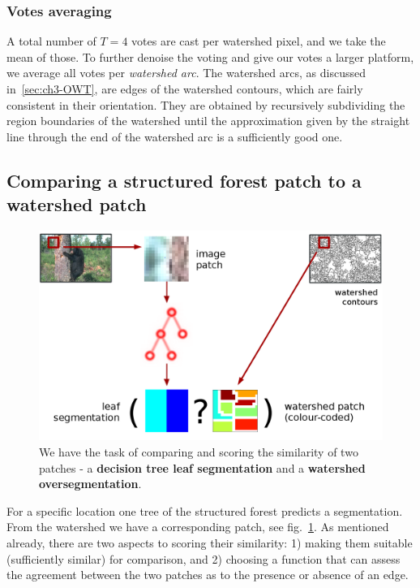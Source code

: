\subsubsection*{Votes averaging}
A total number of $T=4$ votes are cast per watershed pixel, and we take the mean of those. To further denoise the voting and give our votes a larger platform, %
we average all votes per \textit{watershed arc}. The watershed arcs, as discussed in~\ref{sec:ch3-OWT}, are edges of the watershed contours, which are fairly consistent in their orientation. They are obtained by recursively subdividing the region boundaries of the watershed until the approximation given by the straight line through the end of the watershed arc is a sufficiently good one. %

\subsection{Comparing a structured forest patch to a watershed patch}
\begin{figure}[ht!]
\centering
 \includegraphics[width=1\textwidth]{images/SE-SV-UCM/weighting-the-watershed-contours-two-patches.png}
\caption[Structured voting essence: a comparison of two patches]{We have the task of comparing and scoring the similarity of two patches - a \textbf{decision tree leaf segmentation} and a \textbf{watershed oversegmentation}.}
\label{fig:weighting-the-watershed-contours}
\end{figure}

For a specific location one tree of the structured forest predicts a segmentation. From the watershed we have a corresponding patch, see fig.~\ref{fig:weighting-the-watershed-contours}. As mentioned already, there are two aspects to scoring their similarity: 1) making them suitable (\ie sufficiently similar) for comparison, and 2) choosing a function that can assess the agreement between the two patches as to the presence or absence of an edge.

